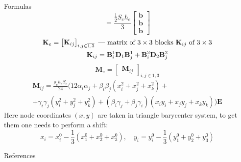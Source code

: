 \documentclass[10pt]{beamer}
\newcommand{\MM}{\mathbf{M}}
\newcommand{\KM}{\mathbf{K}}
\newcommand{\BM}{\mathbf{B}}
\newcommand{\DM}{\mathbf{D}}
\numberwithin{equation}{subsection}
\begin{document}
\begin{frame}[allowframebreaks]{Formulas}
\begin{equation}
							= \frac{\frac12 S_e h_e}{3}
					\begin{bmatrix} \mathbf{b} \\ \mathbf{b} \\ \mathbf{b}  \end{bmatrix}
		\end{equation}
	\begin{gather}
	    \KM_e = \begin{bmatrix}
					\mathbf{K}_{ij}
					\end{bmatrix}_{i, j \in \overline{1,3}}
					 \text{~---~matrix of $3\times3$ blocks $\KM_{ij}$ of $3\times3$}\\\notag
		\mathbf{K}_{ij} = \BM_i^1\DM_1\BM_j^1 +
						\BM_i^2\DM_2\BM_j^2 
	\end{gather}
	\newpage
\begin{equation*}
    \MM_e = \begin{bmatrix}  
	        \MM_{ij}\end{bmatrix}_{i,j \in \overline{1,3}}
\end{equation*}
	\begin{multline}
	\MM_{ij} = \frac{\rho_e h_e S_e}{24} ( 12\alpha_i \alpha_j 
			+ \beta_i \beta_j(x_i^2 + x_j^2 + x_k^2) + \\
			+ \gamma_i \gamma_j(y_i^2 + y_j^2 + y_k^2)
			+(\beta_i\gamma_j + \beta_j\gamma_i)(x_iy_i + x_jy_j + x_ky_k) ) \mathbf{E}
	\end{multline}
	Here node coordinates $(x,y)$ are taken in triangle barycenter system, to get them one needs to perform a shift:
	$$
	    x_i = x^0_i - \frac13(x^0_1 + x^0_2 + x^0_3), \quad  y_i = y^0_i - \frac13(y^0_1 + y^0_2 + y^0_3)
	$$
	
	
\end{frame}

\begin{frame}[allowframebreaks]{References}

  
  

\end{frame}
\end{document}
